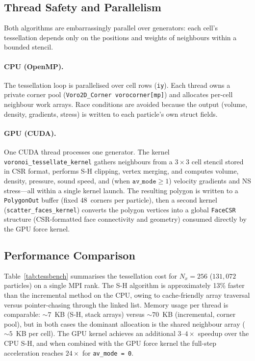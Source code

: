 \documentclass[twocolumn]{aastex63}
\begin{document}
\subsection{Thread Safety and Parallelism}

Both algorithms are embarrassingly parallel over generators: each
cell's tessellation depends only on the positions and weights of
neighbours within a bounded stencil.

\paragraph{CPU (OpenMP).}
The tessellation loop is parallelised over cell rows (\texttt{iy}).
Each thread owns a private corner pool (\texttt{Voro2D\_Corner
vorocorner[mp]}) and allocates per-cell neighbour work arrays.
Race conditions are avoided because the output (volume, density,
gradients, stress) is written to each particle's own struct fields.

\paragraph{GPU (CUDA).}
One CUDA thread processes one generator.  The kernel
\texttt{voronoi\_tessellate\_kernel} gathers neighbours from a
$3\times3$ cell stencil stored in CSR format, performs S-H clipping,
vertex merging, and computes volume, density, pressure, sound speed,
and (when $\texttt{av\_mode}\ge 1$) velocity gradients and NS stress---all
within a single kernel launch.  The resulting polygon is written to a
\texttt{PolygonOut} buffer (fixed $48$~corners per particle), then a
second kernel (\texttt{scatter\_faces\_kernel}) converts the polygon
vertices into a global \texttt{FaceCSR} structure (CSR-formatted face
connectivity and geometry) consumed directly by the GPU force kernel.

\subsection{Performance Comparison}
\label{app:shbench}

Table~\ref{tab:tessbench} summarises the tessellation cost for
$N_x=256$ ($131{,}072$ particles) on a single MPI rank.
The S-H algorithm is approximately 13\% faster than the incremental
method on the CPU, owing to cache-friendly array traversal versus
pointer-chasing through the linked list.  Memory usage per thread is
comparable: ${\sim}7$~KB (S-H, stack arrays) versus ${\sim}70$~KB
(incremental, corner pool), but in both cases the dominant allocation
is the shared neighbour array (${\sim}5$~KB per cell).
The GPU kernel achieves an additional $3$--$4\times$ speedup over
the CPU S-H, and when combined with the GPU force kernel the
full-step acceleration reaches $24\times$ for \texttt{av\_mode\,=\,0}.
\end{document}
